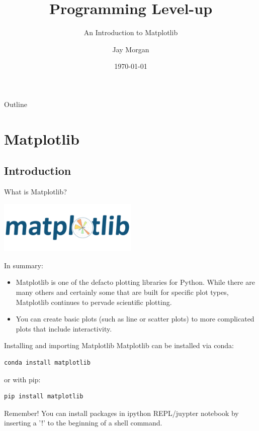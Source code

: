 \documentclass[10pt]{beamer}
\author{Jay Morgan}
\date{\today}
\title{Programming Level-up}
\subtitle{An Introduction to Matplotlib}
\begin{document}
\maketitle
\begin{frame}{Outline}
\tableofcontents
\end{frame}


\section{Matplotlib}
\label{sec:org7f76dd7}

\subsection{Introduction}
\label{sec:org5fb965e}

\begin{frame}[label={sec:org06071af}]{What is Matplotlib?}
\begin{center}
\includegraphics[width=0.5\textwidth]{images/matlogo.png}
\end{center}

In summary:
\begin{itemize}
\item Matplotlib is one of the defacto plotting libraries for Python. While there
are many others and certainly some that are built for specific plot types,
Matplotlib continues to pervade scientific plotting.
\item You can create basic plots (such as line or scatter plots) to more complicated
plots that include interactivity.
\end{itemize}
\end{frame}

\begin{frame}[label={sec:orgfd1f062},fragile]{Installing and importing Matplotlib}
 Matplotlib can be installed via conda:

\begin{verbatim}
conda install matplotlib
\end{verbatim}

or with pip:

\begin{verbatim}
pip install matplotlib
\end{verbatim}

Remember! You can install packages in ipython REPL/juypter notebook by
inserting a '!' to the beginning of a shell command.
\end{frame}
\end{document}
